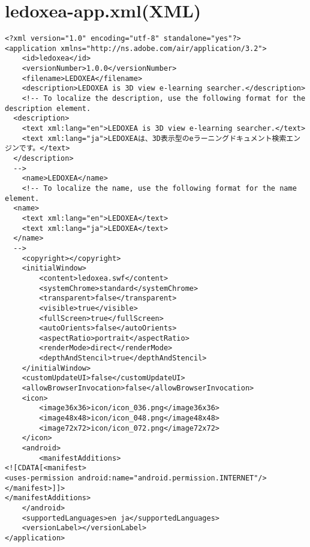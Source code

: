 \section{ledoxea-app.xml(XML)}
{\scriptsize
\begin{verbatim}
<?xml version="1.0" encoding="utf-8" standalone="yes"?>
<application xmlns="http://ns.adobe.com/air/application/3.2">
    <id>ledoxea</id>
    <versionNumber>1.0.0</versionNumber>
    <filename>LEDOXEA</filename>
    <description>LEDOXEA is 3D view e-learning searcher.</description>
    <!-- To localize the description, use the following format for the description element.
  <description>
    <text xml:lang="en">LEDOXEA is 3D view e-learning searcher.</text>
    <text xml:lang="ja">LEDOXEAは、3D表示型のeラーニングドキュメント検索エンジンです。</text>
  </description>
  -->
    <name>LEDOXEA</name>
    <!-- To localize the name, use the following format for the name element.
  <name>
    <text xml:lang="en">LEDOXEA</text>
    <text xml:lang="ja">LEDOXEA</text>
  </name>
  -->
    <copyright></copyright>
    <initialWindow>
        <content>ledoxea.swf</content>
        <systemChrome>standard</systemChrome>
        <transparent>false</transparent>
        <visible>true</visible>
        <fullScreen>true</fullScreen>
        <autoOrients>false</autoOrients>
        <aspectRatio>portrait</aspectRatio>
        <renderMode>direct</renderMode>
        <depthAndStencil>true</depthAndStencil>
    </initialWindow>
    <customUpdateUI>false</customUpdateUI>
    <allowBrowserInvocation>false</allowBrowserInvocation>
    <icon>
        <image36x36>icon/icon_036.png</image36x36>
        <image48x48>icon/icon_048.png</image48x48>
        <image72x72>icon/icon_072.png</image72x72>
    </icon>
    <android>
        <manifestAdditions>
<![CDATA[<manifest>
<uses-permission android:name="android.permission.INTERNET"/>
</manifest>]]>
</manifestAdditions>
    </android>
    <supportedLanguages>en ja</supportedLanguages>
    <versionLabel></versionLabel>
</application>
\end{verbatim}
 }
